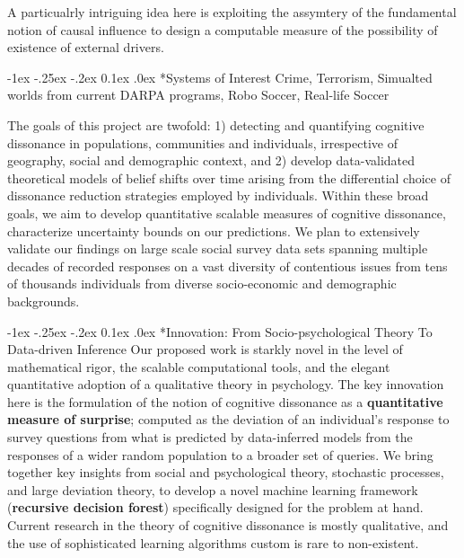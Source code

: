 \documentclass[onecolumn, compsoc,11pt]{IEEEtran}
\makeatletter
\renewcommand\subsection{\@startsection {section}{1}{\z@}%
  {-1ex \@plus -.25ex \@minus -.2ex}%
  {0.1ex \@plus.0ex}%
  {\fontsize{11}{10}\selectfont\bfseries\sffamily\color{DodgerBlue4}}}
\makeatother
\begin{document}
A particualrly intriguing idea here is exploiting the assymtery of the fundamental notion of causal influence to design a computable measure of the possibility of existence of external drivers.


\subsection*{Systems of Interest} Crime, Terrorism, Simualted worlds from current DARPA programs, Robo Soccer, Real-life Soccer

The goals of this project are twofold: 1) detecting and quantifying cognitive dissonance in populations, communities and individuals, irrespective of geography, social and demographic context, and 2) develop data-validated theoretical models of belief shifts over time arising from the differential choice of dissonance reduction strategies employed by individuals. Within these broad goals, we aim to develop quantitative scalable  measures of cognitive dissonance, characterize uncertainty bounds on our predictions. We plan to extensively validate our findings on large scale social survey data sets spanning multiple decades of recorded responses on a vast diversity of contentious issues from tens of thousands individuals from diverse socio-economic and demographic backgrounds. 

\subsection*{Innovation: From Socio-psychological Theory To Data-driven Inference}
Our proposed work is starkly novel in the level of mathematical rigor, the scalable computational tools, and the elegant quantitative adoption of a qualitative theory in psychology. The key innovation here  is the formulation of the notion of cognitive dissonance as a \textbf{quantitative  measure of surprise}; computed as the deviation of an individual's response to
survey questions from what is predicted by data-inferred models from the  responses of a wider random population  to a broader set of queries. We bring together key insights from social and psychological theory, stochastic processes, and large deviation theory, to develop a novel machine learning framework (\textbf{recursive decision forest}) specifically designed for the problem at hand. Current research in the theory of cognitive dissonance is mostly qualitative, and the use of sophisticated learning algorithms custom is rare to non-existent. 
\end{document}
